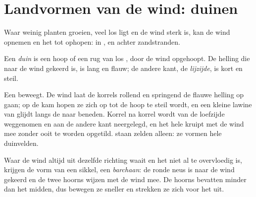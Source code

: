 \section{Landvormen van de wind: duinen}

Waar weinig planten groeien, veel los  ligt en de wind sterk is, kan de
wind  opnemen en het tot  ophopen: in , en achter
zandstranden.

\begin{definition}[Duin]\label{def:g9:landforms:dune}
Een \emph{duin} is een hoop of een rug van los , door de
wind opgehoopt. De helling die naar de wind gekeerd is, is lang en flauw;
de andere kant, de \emph{lijzijde}, is kort en steil.
\end{definition}

Een  beweegt. De wind laat de korrels rollend en springend de flauwe
helling op gaan; op de kam hopen ze zich op tot de hoop te steil wordt, en
een kleine lawine van  glijdt langs de  naar beneden. Korrel na
korrel wordt  van de loefzijde weggenomen en aan de andere kant
neergelegd, en het hele  kruipt met de wind mee zonder ooit te worden
opgetild.  staan zelden alleen: ze vormen hele duinvelden.

Waar de wind altijd uit dezelfde richting waait en het  niet al te
overvloedig is, krijgen  de vorm van een sikkel, een
\emph{barchaan}: de ronde neus is naar de wind gekeerd en de twee hoorns
wijzen met de wind mee. De hoorns bevatten minder  dan het midden, dus
bewegen ze sneller en strekken ze zich voor het  uit.

